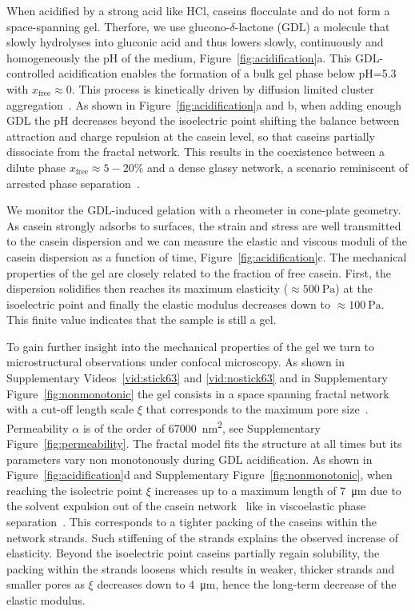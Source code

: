 \documentclass[twocolumn,superscriptaddress,showpacs,preprintnumbers,
amsmath,amssymb,prl]{revtex4-1}
\begin{document}

When acidified by a strong acid like HCl, caseins flocculate and do not form a space-spanning gel. Therfore, we use glucono-$\delta$-lactone (GDL) a molecule that slowly hydrolyses into gluconic acid and thus lowers slowly, continuously and homogeneously the pH of the medium, Figure~\ref{fig:acidification}a. This GDL-controlled acidification enables the formation of a bulk gel phase below pH=5.3 with $x_\text{free}\approx 0$. This process is kinetically driven by diffusion limited cluster aggregation~\cite{Bremer1989}. As shown in Figure~\ref{fig:acidification}a and b, when adding enough GDL the pH decreases beyond the isoelectric point shifting the balance between attraction and charge repulsion at the casein level, so that caseins partially dissociate from the fractal network. This results in the coexistence between a dilute phase $x_\text{free}\approx 5-20\%$ and a dense glassy network, a scenario reminiscent of arrested phase separation~\cite{Cardinaux2007,lu2008gelation}.

We monitor the GDL-induced gelation with a rheometer in cone-plate geometry. As casein strongly adsorbs to surfaces, the strain and stress are well transmitted to the casein dispersion and we can measure the elastic and viscous moduli of the casein dispersion as a function of time, Figure~\ref{fig:acidification}c. The mechanical properties of the gel are closely related to the fraction of free casein. First, the dispersion solidifies then reaches its maximum elasticity ($\approx\SI{500}{\pascal}$) at the isoelectric point and finally the elastic modulus decreases down to $\approx\SI{100}{\pascal}$. This finite value indicates that the sample is still a gel.

To gain further insight into the mechanical properties of the gel we turn to microstructural observations under confocal microscopy. As shown in Supplementary Videos~\ref{vid:stick63} and \ref{vid:nostick63} and in Supplementary Figure~\ref{fig:nonmonotonic} the gel consists in a space spanning fractal network with a cut-off length scale $\xi$ that corresponds to the maximum pore size~\cite{VanDijk1986}. Permeability $\alpha$ is of the order of \SI{67000}{\square\nano\metre}, see Supplementary Figure~\ref{fig:permeability}. The fractal model fits the structure at all times but its parameters vary non monotonously during GDL acidification. As shown in Figure~\ref{fig:acidification}d and Supplementary Figure~\ref{fig:nonmonotonic}, when reaching the isolectric point $\xi$ increases up to a maximum length of \SI{7}{\micro\metre} due to the solvent expulsion out of the casein network~\cite{Lucey1998} like in viscoelastic phase separation~\cite{Tanaka2000h}. This corresponds to a tighter packing of the caseins within the network strands. Such stiffening of the strands explains the observed increase of elasticity. Beyond the isoelectric point caseins partially regain solubility, the packing within the strands loosens which results in weaker, thicker strands and smaller pores as $\xi$ decreases down to \SI{4}{\micro\metre}, hence the long-term decrease of the elastic modulus.
\end{document}
